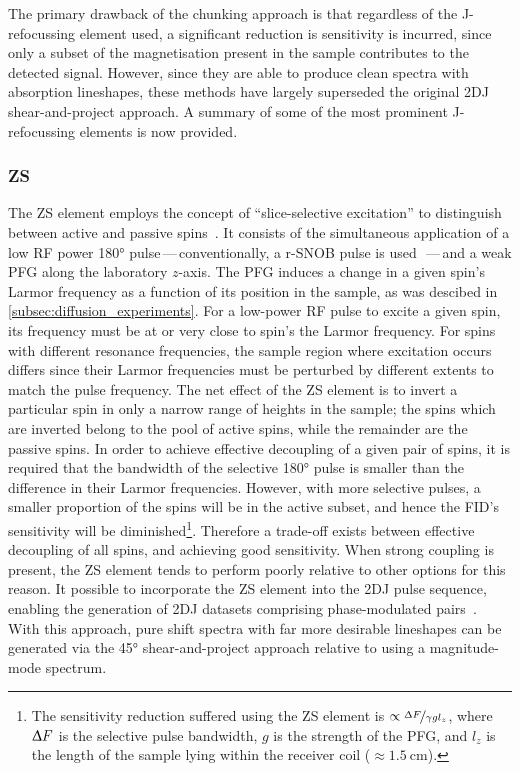 The primary drawback of the chunking approach is that regardless of the
J-refocussing element used, a significant reduction is sensitivity is incurred,
since only a subset of the magnetisation present in the sample contributes to
the detected signal. However, since they are able to produce clean
spectra with absorption lineshapes, these methods have largely superseded the
original \ac{2DJ} shear-and-project approach. A summary of some of the most
prominent J-refocussing elements is now provided.

\subsubsection{\ac{ZS}}
\label{subsec:ZS}
The \ac{ZS} element employs the concept of ``slice-selective excitation'' to
distinguish between active and passive spins~\cite{Zangger1997,Aguilar2010}. It
consists of the simultaneous application of a low \ac{RF} power \ang{180}
pulse\,---\,conventionally, a r-SNOB pulse is used~\cite{Kupce1995}\,---\,and a
weak \ac{PFG} along the laboratory $z$-axis.
The \ac{PFG} induces a change in a given spin's Larmor frequency as a
function of its position in the sample, as was descibed in
\cref{subsec:diffusion_experiments}. For a low-power \ac{RF} pulse to excite
a given spin, its frequency must be at or very close to spin's the Larmor
frequency.
For spins with different resonance frequencies, the sample region where
excitation occurs differs since their Larmor frequencies must be perturbed by
different extents to match the pulse frequency.
The net effect of the \ac{ZS} element is to invert a particular spin in only a
narrow range of heights in the sample; the spins which are inverted belong to
the pool of active spins, while the remainder are the passive spins.
In order to achieve effective decoupling of a given pair of spins, it is required
that the bandwidth of the selective \ang{180} pulse is smaller than the
difference in their Larmor frequencies. However, with more selective pulses,
a smaller proportion of the spins will be in the active subset, and hence the
\ac{FID}'s sensitivity will be diminished\footnote{
    The sensitivity reduction suffered using the \ac{ZS} element is $\propto
    \nicefrac{\Updelta F}{\gamma g l_z}$, where $\Updelta F$ is the selective
    pulse bandwidth, $g$ is the strength of the \ac{PFG}, and $l_z$ is the
    length of the sample lying within the receiver coil ($\approx
    \qty{1.5}{\centi\meter}$).
}.
Therefore a trade-off exists between effective decoupling of all spins, and
achieving good sensitivity. When strong coupling is present,
the \ac{ZS} element tends to perform poorly relative to other options for this
reason. It possible to incorporate the \ac{ZS} element into the \ac{2DJ} pulse
sequence, enabling the generation of \ac{2DJ} datasets comprising
phase-modulated pairs~\cite{Pell2007}. With this approach, pure
shift spectra with far more desirable lineshapes can be generated via the
\ang{45} shear-and-project approach relative to using a magnitude-mode
spectrum.

